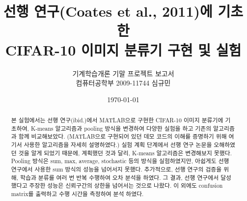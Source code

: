 \documentclass[a4paper,9pt,hidelinks]{article}
\begin{document}
\title{선행 연구(Coates et al., 2011)에 기초한 \\
CIFAR-10 이미지 분류기 구현 및 실험}
\author{기계학습개론 기말 프로젝트 보고서 \\
컴퓨터공학부 2009-11744 심규민}
\date{\koreandate\today}

\maketitle

\begin{abstract}
본 실험에서는 선행 연구(ibid.)에서 MATLAB으로 구현한 CIFAR-10 이미지 분류기에 기초하여, K-means 알고리즘과 pooling 방식을 변경하여 다양한 실험을 하고 기존의 알고리즘과 함께 비교해보았다.
(MATLAB으로 구현되어 있던 데모 코드의 이해를 증명하기 위해 여기서 사용한 알고리즘을 자세히 설명하였다.)
실험 계획 단계에서 선행 연구 논문을 오해하였던 것을 알게 되었기 때문에, 계획했던 것과 달리, K-means 알고리즘은 변경해보지 못했다.
Pooling 방식은 sum, max, average, stochastic 등의 방식을 실험하였지만, 아쉽게도 선행 연구에서 사용한 sum 방식의 성능을 넘어서지 못했다.
추가적으로, 선행 연구의 검증을 위해, 학습과 분류를 여러 번 반복 수행하여 오차 분석을 하였다.
그 결과, 선행 연구에서 달성했다고 주장한 성능은 신뢰구간의 상한을 넘어서는 것으로 나왔다.
이 외에도 confusion matrix를 출력하고 수행 시간을 측정하여 분석 하였다.
\end{abstract}

\tableofcontents

\pagebreak
\end{document}
